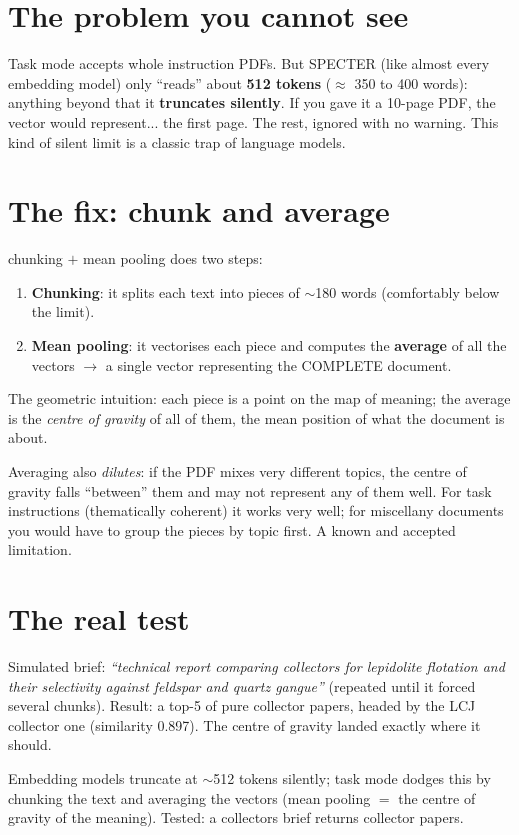 \documentclass[11pt,a4paper]{article}
\begin{document}

\section{The problem you cannot see}

Task mode accepts whole instruction PDFs. But SPECTER (like almost every embedding model) only
``reads'' about \textbf{512 tokens} ($\approx$ 350 to 400 words): anything beyond that it
\textbf{truncates silently}. If you gave it a 10-page PDF, the vector would represent... the
first page. The rest, ignored with no warning. This kind of silent limit is a classic trap of
language models.

\section{The fix: chunk and average}

\begin{concepto}{chunking $+$ mean pooling}
 does two steps:
\begin{enumerate}
  \item \textbf{Chunking}: it splits each text into pieces of $\sim$180 words (comfortably
        below the limit).
  \item \textbf{Mean pooling}: it vectorises each piece and computes the \textbf{average} of
        all the vectors $\rightarrow$ a single vector representing the COMPLETE document.
\end{enumerate}
The geometric intuition: each piece is a point on the map of meaning; the average is the
\emph{centre of gravity} of all of them, the mean position of what the document is about.
\end{concepto}

\begin{ojo}
Averaging also \emph{dilutes}: if the PDF mixes very different topics, the centre of gravity
falls ``between'' them and may not represent any of them well. For task instructions
(thematically coherent) it works very well; for miscellany documents you would have to group
the pieces by topic first. A known and accepted limitation.
\end{ojo}

\section{The real test}

Simulated brief: \emph{``technical report comparing collectors for lepidolite flotation and
their selectivity against feldspar and quartz gangue''} (repeated until it forced several
chunks). Result: a top-5 of pure collector papers, headed by the LCJ collector one (similarity
0.897). The centre of gravity landed exactly where it should.

\begin{resumen}
Embedding models truncate at $\sim$512 tokens silently; task mode dodges this by chunking the
text and averaging the vectors (mean pooling $=$ the centre of gravity of the meaning). Tested:
a collectors brief returns collector papers.
\end{resumen}
\end{document}
